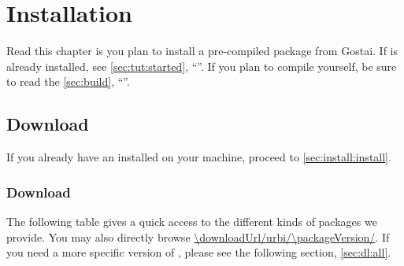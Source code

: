 
\chapter{Installation}
\label{sec:installation}

Read this chapter is you plan to install a pre-compiled package from Gostai.
If \urbi is already installed, see \autoref{sec:tut:started},
``''.  If you plan to compile \urbi yourself, be
sure to read the \autoref{sec:build}, ``''.

\section{Download}

If you already have an \urbi installed on your machine, proceed to
\autoref{sec:install:install}.

\subsection{Download \urbi \packageVersion}
\label{sec:dl:latest}

The following table gives a quick access to the different kinds of packages
we provide.  You may also directly browse
\url{\downloadUrl/urbi/\packageVersion/}.  If you need a more specific
version of \usdk, please see the following section, \autoref{sec:dl:all}.

